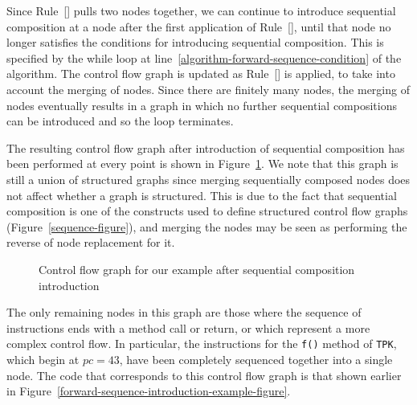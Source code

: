 Since Rule~[] pulls two nodes
together, we can continue to introduce sequential composition at a
node after the first application of
Rule~[], until that node no longer
satisfies the conditions for introducing sequential composition.
This is specified by the while loop at
line~\ref{algorithm-forward-sequence-condition} of the algorithm.
The control flow graph is updated as
Rule~[] is applied, to take into
account the merging of nodes.
Since there are finitely many nodes, the merging of nodes eventually
results in a graph in which no further sequential compositions can be
introduced and so the loop terminates.

The resulting control flow graph after introduction of sequential
composition has been performed at every point is shown in
Figure~\ref{example-control-flow-graph-after-sequence-introduction-figure}.
We note that this graph is still a union of structured graphs since
merging sequentially composed nodes does not affect whether a graph is
structured.
This is due to the fact that sequential composition is one of the
constructs used to define structured control flow graphs
(Figure~\ref{sequence-figure}), and merging the nodes may be seen as
performing the reverse of node replacement for it.
\begin{figure}
  \begin{center}
  \end{center}
  \caption{Control flow graph for our example after sequential composition introduction}
  \label{example-control-flow-graph-after-sequence-introduction-figure}
\end{figure}

The only remaining nodes in this graph are those where the sequence of
instructions ends with a method call or return, or which represent a
more complex control flow.
In particular, the instructions for the \texttt{f()} method of
\texttt{TPK}, which begin at $pc = 43$, have been completely sequenced
together into a single node.
The code that corresponds to this control flow graph is that shown
earlier in Figure~\ref{forward-sequence-introduction-example-figure}.